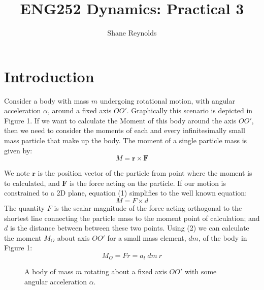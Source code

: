 \documentclass[a4paper]{article}
\begin{document}
\title{ENG252 Dynamics: Practical 3}
\author{Shane Reynolds}
\maketitle

\section{Introduction}
Consider a body with mass $m$ undergoing rotational motion, with angular acceleration $\alpha$, around a fixed axis $OO'$. Graphically this scenario is depicted in Figure 1. If we want to calculate the Moment of this body around the axis $OO'$, then we need to consider the moments of each and every infinitesimally small mass particle that make up the body. The moment of a single particle mass is given by:
\begin{equation}
M = \boldsymbol{r} \times \boldsymbol{F}
\end{equation}

We note $\boldsymbol{r}$ is the position vector of the particle from point where the moment is to calculated, and $\boldsymbol{F}$ is the force acting on the particle. If our motion is constrained to a 2D plane, equation (1) simplifies to the well known equation:
\begin{equation}
M = F \times d
\end{equation}
The quantity $F$ is the scalar magnitude of the force acting orthogonal to the shortest line connecting the particle mass to the moment point of calculation; and $d$ is the distance between between these two points. Using (2) we can calculate the moment $M_O$ about axis $OO'$ for a small mass element, $dm$, of the body in Figure 1:
\begin{equation}
	M_O = Fr = a_t \ dm \ r 
\end{equation}

\begin{figure}[h]
	\centering
	\caption{A body of mass $m$ rotating about a fixed axis $OO'$ with some angular acceleration $\alpha$.}
\end{figure}
\end{document}
